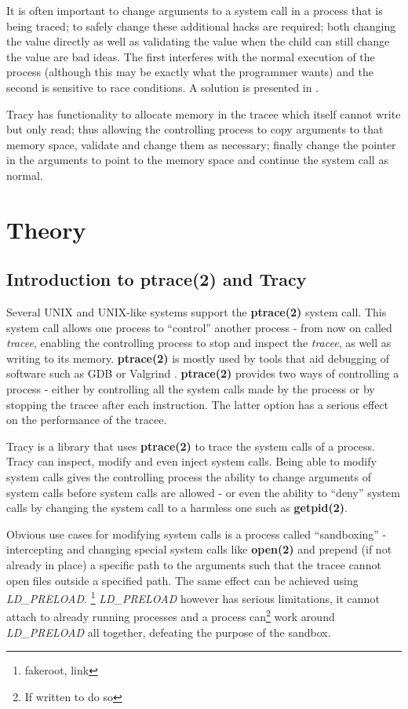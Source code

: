 \documentclass[a4paper, twoside, 10pt, twocolumn]{report}
\begin{document}
It is often important to change arguments to a system call in a process that is
being traced; to safely change these additional hacks are required;
both changing the value directly as well as validating the value when the child
can still change the value are bad ideas.
The first interferes with the normal execution of the process
(although this may be exactly what the programmer wants) and the second is
sensitive to race conditions. A solution is presented in
\cite{Noordende_asecure}.

Tracy has functionality to allocate memory in the
tracee which itself cannot write but only read; thus allowing the controlling
process to copy arguments to that memory space, validate and change them as
necessary; finally change the pointer in the arguments to point to the memory
space and continue the system call as normal.

\chapter{Theory}

\section{Introduction to ptrace(2) and Tracy}

Several UNIX and UNIX-like systems support the \textbf{ptrace(2)} system call.
This system call allows one process to ``control'' another process - from now on
called \textit{tracee}, enabling the controlling process to stop and inspect
the \textit{tracee}, as well as writing to its memory. \textbf{ptrace(2)} is
mostly used by tools that aid debugging of software such as GDB\cite{} or
Valgrind \cite{}. \textbf{ptrace(2)} provides two ways of controlling a process
- either by controlling all the system calls made by the process or by stopping
the tracee after each instruction. The latter option has a serious effect on the
performance of the tracee.

Tracy is a library that uses \textbf{ptrace(2)} to trace the system calls of a
process. Tracy can inspect, modify and even inject system calls. Being able to
modify system calls gives the controlling process the ability to change
arguments of system calls before system calls are allowed - or even the ability
to ``deny'' system calls by changing the system call to a harmless one such as
\textbf{getpid(2)}.

Obvious use cases for modifying system calls is a process
called ``sandboxing'' - intercepting and changing special system calls like
\textbf{open(2)} and prepend (if not already in place) a specific path to the
arguments such that the tracee cannot open files outside a specified path.
The same effect can be achieved using \textit{LD\_PRELOAD}. \footnote{fakeroot,
link}%
\textit{LD\_PRELOAD} however has serious limitations, it cannot attach to
already running processes and a process can\footnote{If written to do so} work
around \textit{LD\_PRELOAD} all together, defeating the purpose of the sandbox.
\end{document}
